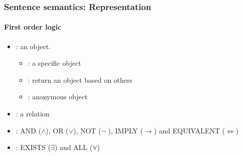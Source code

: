 \documentclass[xcolor=table]{beamer}
\begin{document}
\begin{frame}
	\frametitle{Sentence semantics: Representation}
	\framesubtitle{First order logic}
	
	\begin{itemize}
		\item {}: an object.
		\begin{itemize}
			\item {}: a specific object
			
			\item {}: return an object based on others
			
			\item {}: anonymous object 
			
		\end{itemize}
		\item {}: a relation 
		
		
		\item {}: AND ($ \wedge $), OR ($ \vee $), NOT ($ \neg $ ), IMPLY ($\rightarrow$) and EQUIVALENT ($ \Leftrightarrow $)
		
		
		\item {}: EXISTS ($\exists$) and ALL ($\forall$)
		
		
	\end{itemize}
	
\end{frame}
\end{document}
